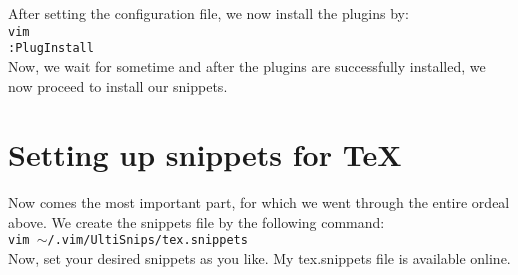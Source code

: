 \documentclass[11pt]{article}
\theoremstyle{plain}%
\theoremstyle{definition}
\theoremstyle{remark}
\begin{document}
	After setting the configuration file, we now install the plugins by: \\
	\texttt{vim \\
	:PlugInstall} \\
	Now, we wait for sometime and after the plugins are successfully installed, we now proceed to install our snippets.
	\section{Setting up snippets for \TeX}
	Now comes the most important part, for which we went through the entire ordeal above. We create the snippets file by the following command: \\
	\texttt{vim $\sim$/.vim/UltiSnips/tex.snippets}\\
	Now, set your desired snippets as you like. My tex.snippets file is available online. 
		
\end{document}
